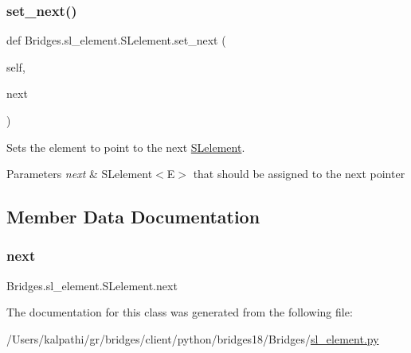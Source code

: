 \subsubsection{\texorpdfstring{set\+\_\+next()}{set\_next()}}
{\footnotesize\ttfamily def Bridges.\+sl\+\_\+element.\+S\+Lelement.\+set\+\_\+next (\begin{DoxyParamCaption}\item[{}]{self,  }\item[{}]{next }\end{DoxyParamCaption})}



Sets the element to point to the next \mbox{\hyperlink{class_bridges_1_1sl__element_1_1_s_lelement}{S\+Lelement}}. 


\begin{DoxyParams}{Parameters}
{\em next} & S\+Lelement$<$\+E$>$ that should be assigned to the next pointer \\
\hline
\end{DoxyParams}


\subsection{Member Data Documentation}
\mbox{\label{class_bridges_1_1sl__element_1_1_s_lelement_a96a8af8acbfe6f35cfdd1fd8ab16281d}} 
\subsubsection{\texorpdfstring{next}{next}}
{\footnotesize\ttfamily Bridges.\+sl\+\_\+element.\+S\+Lelement.\+next}



The documentation for this class was generated from the following file\+:\begin{DoxyCompactItemize}
\item 
/\+Users/kalpathi/gr/bridges/client/python/bridges18/\+Bridges/\mbox{\hyperlink{sl__element_8py}{sl\+\_\+element.\+py}}\end{DoxyCompactItemize}

